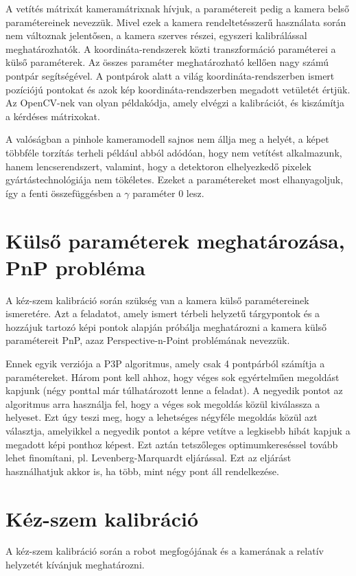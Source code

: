 A vetítés mátrixát kameramátrixnak hívjuk, a paramétereit pedig a kamera belső paramétereinek nevezzük. Mivel ezek a kamera rendeltetésszerű használata során nem változnak jelentősen, a kamera szerves részei, egyszeri kalibrálással meghatározhatók. A koordináta-rendszerek közti transzformáció paraméterei a külső paraméterek. Az összes paraméter meghatározható kellően nagy számú pontpár segítségével. A pontpárok alatt a világ koordináta-rendszerben ismert pozíciójú pontokat és azok kép koordináta-rendszerben megadott vetületét értjük. Az OpenCV-nek van olyan példakódja, amely elvégzi a kalibrációt, és kiszámítja a kérdéses mátrixokat.

A valóságban a pinhole kameramodell sajnos nem állja meg a helyét, a képet többféle torzítás terheli például abból adódóan, hogy nem vetítést alkalmazunk, hanem lencserendszert, valamint, hogy a detektoron elhelyezkedő pixelek gyártástechnológiája nem tökéletes. Ezeket a paramétereket most elhanyagoljuk, így a fenti összefüggésben a $\gamma$ paraméter 0 lesz.

	\section{Külső paraméterek meghatározása, PnP probléma}
	A kéz-szem kalibráció során szükség van a kamera külső paramétereinek ismeretére. Azt a feladatot, amely ismert térbeli helyzetű tárgypontok és a hozzájuk tartozó képi pontok alapján próbálja meghatározni a kamera külső paramétereit PnP, azaz Perspective-n-Point problémának nevezzük. 
	
Ennek egyik verziója a P3P algoritmus, amely csak 4 pontpárból számítja a paramétereket. Három pont kell ahhoz, hogy véges sok egyértelműen megoldást kapjunk (négy ponttal már túlhatározott lenne a feladat). A negyedik pontot az algoritmus arra használja fel, hogy a véges sok megoldás közül kiválassza a helyeset. Ezt úgy teszi meg, hogy a lehetséges négyféle megoldás közül azt választja, amelyikkel a negyedik pontot a képre vetítve a legkisebb hibát kapjuk a megadott képi ponthoz képest. Ezt aztán tetszőleges optimumkereséssel tovább lehet finomítani, pl. Levenberg-Marquardt eljárással. Ezt az eljárást használhatjuk akkor is, ha több, mint négy pont áll rendelkezése.
	
	\section{Kéz-szem kalibráció}
	A kéz-szem kalibráció során a robot megfogójának és a kamerának a relatív helyzetét kívánjuk meghatározni.

